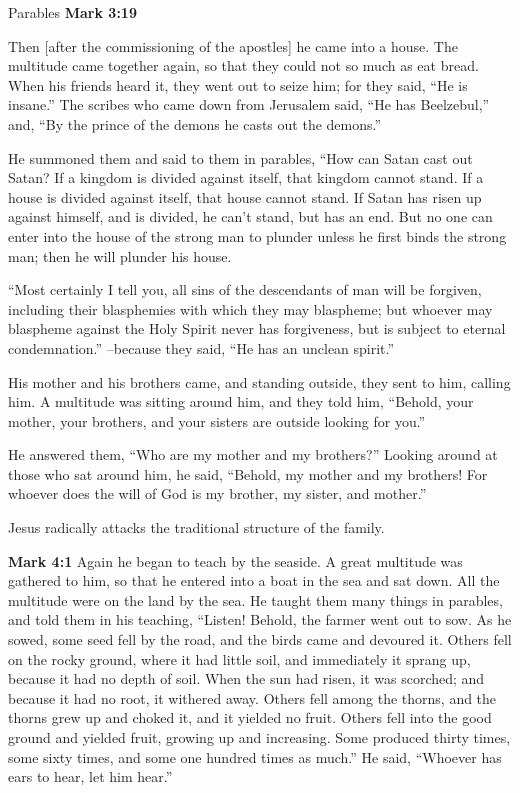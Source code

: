 \documentclass[10pt,twoside]{book}
\newcommand{\quotesize}{\normalsize{}}
\newcommand{\comm}[1]{\begingroup \color{black!50} #1\endgroup}
\newenvironment{quotetext}{\begingroup\quotesize}{\endgroup}
\newcommand{\bible}[2]{\begin{quotetext}\textbf{#1} #2\end{quotetext}}
\newcommand{\gospelmark}[2]{\bible{Mark #1}{#2}}
\begin{document}
\begin{section}{Parables}
\gospelmark{3:19}{

Then [after the commissioning of the apostles] he came into a house.   The multitude came together again, so that they could not so much as eat bread.   When his friends heard it, they went out to seize him; for they said, ``He is insane.''   The scribes who came down from Jerusalem said, ``He has Beelzebul,'' and, ``By the prince of the demons he casts out the demons.''

  He summoned them and said to them in parables, ``How can Satan cast out Satan?    If a kingdom is divided against itself, that kingdom cannot stand.    If a house is divided against itself, that house cannot stand.    If Satan has risen up against himself, and is divided, he can't stand, but has an end.    But no one can enter into the house of the strong man to plunder unless he first binds the strong man; then he will plunder his house.

   ``Most certainly I tell you, all sins of the descendants of man will be forgiven, including their blasphemies with which they may blaspheme;    but whoever may blaspheme against the Holy Spirit never has forgiveness, but is subject to eternal condemnation.''   --because they said, ``He has an unclean spirit.''

  His mother and his brothers came, and standing outside, they sent to him, calling him.   A multitude was sitting around him, and they told him, ``Behold, your mother, your brothers, and your sisters are outside looking for you.''

  He answered them, ``Who are my mother and my brothers?''   Looking around at those who sat around him, he said, ``Behold, my mother and my brothers!    For whoever does the will of God is my brother, my sister, and mother.''
}

\comm{
Jesus radically attacks the traditional structure of the family.
}

\gospelmark{4:1}{
   Again he began to teach by the seaside. A great multitude was gathered to him, so that he entered into a boat in the sea and sat down. All the multitude were on the land by the sea.   He taught them many things in parables, and told them in his teaching,    ``Listen! Behold, the farmer went out to sow.    As he sowed, some seed fell by the road, and the birds came and devoured it.    Others fell on the rocky ground, where it had little soil, and immediately it sprang up, because it had no depth of soil.    When the sun had risen, it was scorched; and because it had no root, it withered away.    Others fell among the thorns, and the thorns grew up and choked it, and it yielded no fruit.    Others fell into the good ground and yielded fruit, growing up and increasing. Some produced thirty times, some sixty times, and some one hundred times as much.''   He said, ``Whoever has ears to hear, let him hear.''

}
\end{section}
\end{document}
